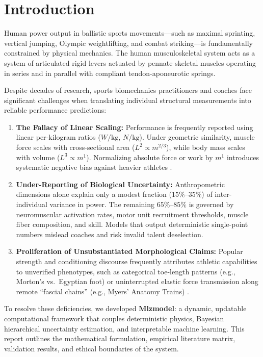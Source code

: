 \documentclass[11pt,a4paper]{article}
\begin{document}
\newpage
\tableofcontents
\newpage

\section{Introduction}

Human power output in ballistic sports movements---such as maximal sprinting, vertical jumping, Olympic weightlifting, and combat striking---is fundamentally constrained by physical mechanics. The human musculoskeletal system acts as a system of articulated rigid levers actuated by pennate skeletal muscles operating in series and in parallel with compliant tendon-aponeurotic springs.

Despite decades of research, sports biomechanics practitioners and coaches face significant challenges when translating individual structural measurements into reliable performance predictions:
\begin{enumerate}
    \item \textbf{The Fallacy of Linear Scaling:} Performance is frequently reported using linear per-kilogram ratios ($W/\text{kg}$, $N/\text{kg}$). Under geometric similarity, muscle force scales with cross-sectional area ($L^2 \propto m^{2/3}$), while body mass scales with volume ($L^3 \propto m^1$). Normalizing absolute force or work by $m^1$ introduces systematic negative bias against heavier athletes \cite{jaric2002, markovic2004}.
    \item \textbf{Under-Reporting of Biological Uncertainty:} Anthropometric dimensions alone explain only a modest fraction ($15\%\text{--}35\%$) of inter-individual variance in power. The remaining $65\%\text{--}85\%$ is governed by neuromuscular activation rates, motor unit recruitment thresholds, muscle fiber composition, and skill. Models that output deterministic single-point numbers mislead coaches and risk invalid talent deselection.
    \item \textbf{Proliferation of Unsubstantiated Morphological Claims:} Popular strength and conditioning discourse frequently attributes athletic capabilities to unverified phenotypes, such as categorical toe-length patterns (e.g., Morton's vs.\ Egyptian foot) or uninterrupted elastic force transmission along remote ``fascial chains'' (e.g., Myers' Anatomy Trains) \cite{wilke2016, ugalde2015}.
\end{enumerate}

To resolve these deficiencies, we developed \textbf{Mlzmodel}: a dynamic, updatable computational framework that couples deterministic physics, Bayesian hierarchical uncertainty estimation, and interpretable machine learning. This report outlines the mathematical formulation, empirical literature matrix, validation results, and ethical boundaries of the system.
\end{document}
